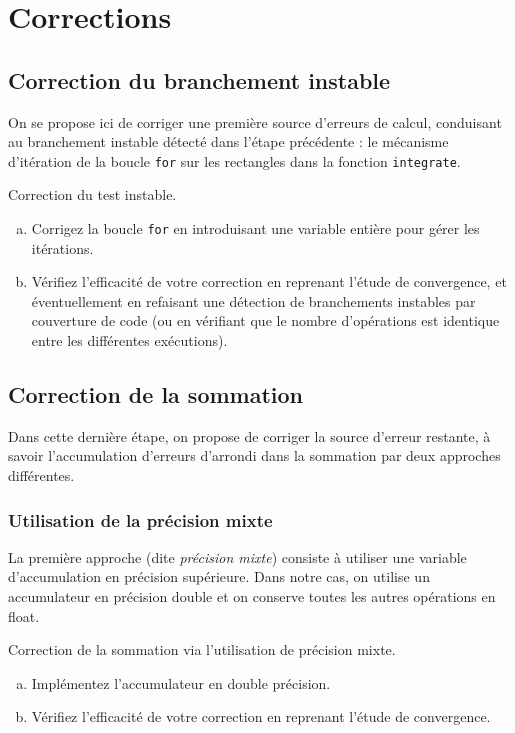 \documentclass[a4paper]{article}
\newcounter{Question}
\newenvironment{question}[1][\unskip]{
  \bigskip
  \stepcounter{Question}
  \def\questionTitle{ #1}
  \begin{mdframed}[style=question]
  }{
  \end{mdframed}
}
\begin{document}
\section{Corrections}
\subsection{Correction du branchement instable}
\label{sec:fix.if}

On se propose ici de corriger une première source d'erreurs de calcul,
conduisant au branchement instable détecté dans l'étape précédente : le
mécanisme d'itération de la boucle \texttt{for} sur les rectangles dans la
fonction \texttt{integrate}.

\begin{question}
  Correction du test instable.
  \begin{enumerate}[(a)]
  \item Corrigez la boucle \texttt{for} en introduisant une variable entière
    pour gérer les itérations.
  \item Vérifiez l'efficacité de votre correction en reprenant l'étude de
    convergence, et éventuellement en refaisant une détection de branchements
    instables par couverture de code (ou en vérifiant que le nombre d'opérations
    est identique entre les différentes exécutions).
  \end{enumerate}
\end{question}


\subsection{Correction de la sommation}
Dans cette dernière étape, on propose de corriger la source d'erreur restante, à savoir
l'accumulation d'erreurs d'arrondi dans la sommation par deux approches différentes.

\subsubsection{Utilisation de la précision mixte}
La première approche (dite \textit{précision mixte}) consiste à
utiliser une variable d'accumulation
en précision supérieure. Dans notre cas, on utilise un accumulateur en
précision double et on conserve toutes les autres opérations en float.

\begin{question}
  Correction de la sommation via l'utilisation de précision mixte.
  \begin{enumerate}[(a)]
  \item Implémentez l'accumulateur en double précision.
  \item Vérifiez l'efficacité de votre correction en reprenant l'étude de
    convergence.
  \end{enumerate}
\end{question}
\end{document}
